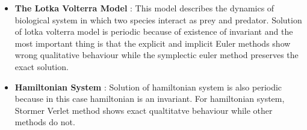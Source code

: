 \documentclass[PhD]{iitmdiss}
\begin{document}
{\begin{itemize}
    \item {\textbf{The Lotka Volterra Model} : This model describes the dynamics of biological system in which two species interact as prey and predator. Solution of lotka volterra model is periodic because of existence of invariant and the most important thing is that the explicit and implicit Euler methods show wrong qualitative behaviour while the symplectic euler method preserves the exact solution.}\\
    \item{\textbf{Hamiltonian System} : Solution of hamiltonian system is also periodic because in this case hamiltonian is an invariant. For hamiltonian system, Stormer Verlet method shows exact qualtitatve behaviour while other methods do not.}\\
    
\end{itemize}
}
\end{document}
